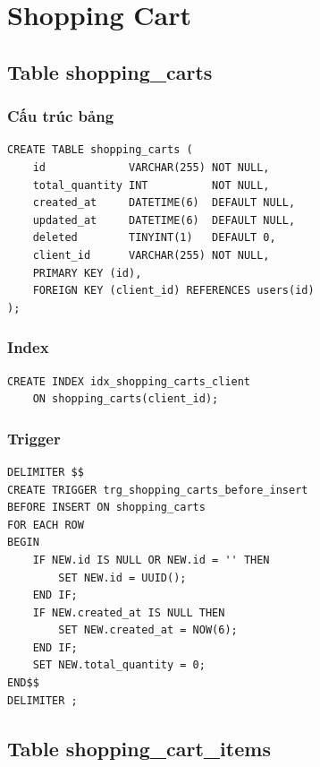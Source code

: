 \section{Shopping Cart}

\subsection{Table shopping\_carts}

\subsubsection{Cấu trúc bảng}

\begin{verbatim}
CREATE TABLE shopping_carts (
    id             VARCHAR(255) NOT NULL,
    total_quantity INT          NOT NULL,
    created_at     DATETIME(6)  DEFAULT NULL,
    updated_at     DATETIME(6)  DEFAULT NULL,
    deleted        TINYINT(1)   DEFAULT 0,
    client_id      VARCHAR(255) NOT NULL,
    PRIMARY KEY (id),
    FOREIGN KEY (client_id) REFERENCES users(id)
);
\end{verbatim}

\subsubsection{Index}

\begin{verbatim}
CREATE INDEX idx_shopping_carts_client
    ON shopping_carts(client_id);
\end{verbatim}

\subsubsection{Trigger}

\begin{verbatim}
DELIMITER $$
CREATE TRIGGER trg_shopping_carts_before_insert
BEFORE INSERT ON shopping_carts
FOR EACH ROW
BEGIN
    IF NEW.id IS NULL OR NEW.id = '' THEN
        SET NEW.id = UUID();
    END IF;
    IF NEW.created_at IS NULL THEN
        SET NEW.created_at = NOW(6);
    END IF;
    SET NEW.total_quantity = 0;
END$$
DELIMITER ;
\end{verbatim}

\subsection{Table shopping\_cart\_items}

